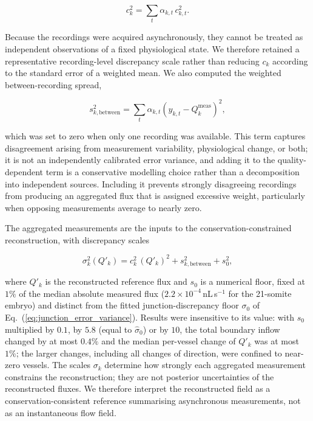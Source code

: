 \begin{equation}
c_k^2
=
\sum_t \alpha_{k,t}\,c_{k,t}^2 .
\label{eq:aggregated_uncertainty}
\end{equation}

Because the recordings were acquired asynchronously, they cannot be treated as independent observations of a fixed
physiological state. We therefore retained a representative recording-level discrepancy scale rather than reducing $c_k$
according to the standard error of a weighted mean. We also computed the weighted between-recording spread,

\begin{equation}
s_{k,\mathrm{between}}^2
=
\sum_t \alpha_{k,t}\left(y_{k,t}-Q_k^{\mathrm{meas}}\right)^2,
\label{eq:between_recording}
\end{equation}

which was set to zero when only one recording was available. This term captures disagreement arising from measurement
variability, physiological change, or both; it is not an independently calibrated error variance, and adding it to the
quality-dependent term is a conservative modelling choice rather than a decomposition into independent sources.
Including it prevents strongly disagreeing recordings from producing an aggregated flux that is assigned excessive
weight, particularly when opposing measurements average to nearly zero.

The aggregated measurements are the inputs to the conservation-constrained reconstruction, with discrepancy scales

\begin{equation}
\sigma_k^2(Q'_k)
=
c_k^2\,(Q'_k)^2
+s_{k,\mathrm{between}}^2
+s_0^2,
\label{eq:reconstruction_uncertainty}
\end{equation}

where $Q'_k$ is the reconstructed reference flux and $s_0$ is a numerical floor, fixed at $1\%$ of the median absolute
measured flux ($2.2\times10^{-4}$\,nL\,s$^{-1}$ for the 21-somite embryo) and distinct from the fitted
junction-discrepancy floor $\sigma_0$ of Eq.~(\ref{eq:junction_error_variance}). Results were insensitive to its value:
with $s_0$ multiplied by $0.1$, by $5.8$ (equal to $\hat\sigma_0$) or by $10$, the total boundary inflow changed by at
most $0.4\%$ and the median per-vessel change of $Q'_k$ was at most $1\%$; the larger changes, including all changes of
direction, were confined to near-zero vessels. The scales $\sigma_k$ determine how strongly each aggregated measurement constrains
the reconstruction; they are not posterior uncertainties of the reconstructed fluxes. We therefore interpret the
reconstructed field as a conservation-consistent reference summarising asynchronous measurements, not as an
instantaneous flow field.

